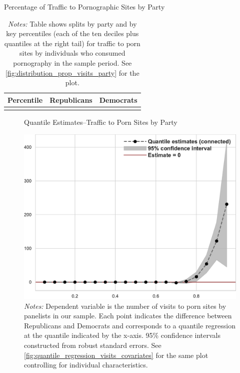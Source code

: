 \documentclass[12pt, letterpaper]{article}
\begin{document}
\begin{table} \centering \small \setlength\tabcolsep{10 pt}
	\caption{Percentage of Traffic to Pornographic Sites by Party}
	\label{tab:distribution_prop_visits_party}
	\begin{adjustbox}{max width=\textwidth}
		\begin{tabular}{@{\hspace{0\tabcolsep}}ccc@{\hspace{0\tabcolsep}}}
			\toprule
			\multicolumn{1}{l}{\textbf{Percentile}}&\multicolumn{1}{c}{\textbf{Republicans}}&\multicolumn{1}{r}{\textbf{Democrats}}\\
			\midrule
			\\
			\bottomrule
		\end{tabular}
	\end{adjustbox}
	\caption*{\footnotesize \emph{Notes:} 
		Table shows splits by party and by key percentiles (each of the ten deciles plus quantiles at the right tail) for traffic to porn sites by individuals who consumed pornography in the sample period. See \cref{fig:distribution_prop_visits_party} for the plot.
	}
\end{table}


\begin{figure}
	\centering
	\caption{Quantile Estimates--Traffic to Porn Sites by Party}
	\includegraphics[width=.6\linewidth]{../figs/quantile_reg_visits_adult.pdf}
	\caption*{\footnotesize \emph{Notes:} 
		Dependent variable is the number of visits to porn sites by panelists in our sample.
		Each point indicates the difference between Republicans and Democrats and corresponds to a quantile regression at the quantile indicated by the x-axis.
		95\% confidence intervals constructed from robust standard errors.
		See \cref{fig:quantile_regression_visits_covariates} for the same plot controlling for individual characteristics.
	}
	\label{fig:quantile_regression_visits}
\end{figure}
\end{document}

